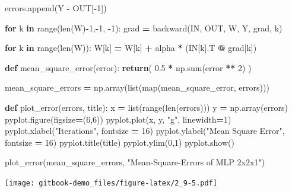 \documentclass[
]{book}
\newenvironment{Shaded}{\begin{snugshade}}{\end{snugshade}}
\newcommand{\BuiltInTok}[1]{#1}
\newcommand{\ControlFlowTok}[1]{\textcolor[rgb]{0.13,0.29,0.53}{\textbf{#1}}}
\newcommand{\DecValTok}[1]{\textcolor[rgb]{0.00,0.00,0.81}{#1}}
\newcommand{\FloatTok}[1]{\textcolor[rgb]{0.00,0.00,0.81}{#1}}
\newcommand{\KeywordTok}[1]{\textcolor[rgb]{0.13,0.29,0.53}{\textbf{#1}}}
\newcommand{\NormalTok}[1]{#1}
\newcommand{\OperatorTok}[1]{\textcolor[rgb]{0.81,0.36,0.00}{\textbf{#1}}}
\newcommand{\StringTok}[1]{\textcolor[rgb]{0.31,0.60,0.02}{#1}}
\begin{document}
\begin{Shaded}
\begin{Highlighting}[]
\NormalTok{  errors.append(Y }\OperatorTok{{-}}\NormalTok{ OUT[}\OperatorTok{{-}}\DecValTok{1}\NormalTok{])}
    
  \ControlFlowTok{for}\NormalTok{ k }\KeywordTok{in} \BuiltInTok{range}\NormalTok{(}\BuiltInTok{len}\NormalTok{(W)}\OperatorTok{{-}}\DecValTok{1}\NormalTok{,}\OperatorTok{{-}}\DecValTok{1}\NormalTok{, }\OperatorTok{{-}}\DecValTok{1}\NormalTok{):}
\NormalTok{    grad }\OperatorTok{=}\NormalTok{ backward(IN, OUT, W, Y, grad, k) }
    
  \ControlFlowTok{for}\NormalTok{ k }\KeywordTok{in} \BuiltInTok{range}\NormalTok{(}\BuiltInTok{len}\NormalTok{(W)):}
\NormalTok{    W[k] }\OperatorTok{=}\NormalTok{ W[k] }\OperatorTok{+}\NormalTok{ alpha }\OperatorTok{*}\NormalTok{ (IN[k].T }\OperatorTok{@}\NormalTok{ grad[k])}



\KeywordTok{def}\NormalTok{ mean\_square\_error(error):}
  \ControlFlowTok{return}\NormalTok{( }\FloatTok{0.5} \OperatorTok{*}\NormalTok{ np.}\BuiltInTok{sum}\NormalTok{(error }\OperatorTok{**} \DecValTok{2}\NormalTok{) )}

\NormalTok{mean\_square\_errors }\OperatorTok{=}\NormalTok{ np.array(}\BuiltInTok{list}\NormalTok{(}\BuiltInTok{map}\NormalTok{(mean\_square\_error, errors)))}

\KeywordTok{def}\NormalTok{ plot\_error(errors, title):}
\NormalTok{  x }\OperatorTok{=} \BuiltInTok{list}\NormalTok{(}\BuiltInTok{range}\NormalTok{(}\BuiltInTok{len}\NormalTok{(errors)))}
\NormalTok{  y }\OperatorTok{=}\NormalTok{ np.array(errors)}
\NormalTok{  pyplot.figure(figsize}\OperatorTok{=}\NormalTok{(}\DecValTok{6}\NormalTok{,}\DecValTok{6}\NormalTok{))}
\NormalTok{  pyplot.plot(x, y, }\StringTok{"g"}\NormalTok{, linewidth}\OperatorTok{=}\DecValTok{1}\NormalTok{)}
\NormalTok{  pyplot.xlabel(}\StringTok{"Iterations"}\NormalTok{, fontsize }\OperatorTok{=} \DecValTok{16}\NormalTok{)}
\NormalTok{  pyplot.ylabel(}\StringTok{"Mean Square Error"}\NormalTok{, fontsize }\OperatorTok{=} \DecValTok{16}\NormalTok{)}
\NormalTok{  pyplot.title(title)}
\NormalTok{  pyplot.ylim(}\DecValTok{0}\NormalTok{,}\DecValTok{1}\NormalTok{)}
\NormalTok{  pyplot.show()}
  
\NormalTok{plot\_error(mean\_square\_errors, }\StringTok{"Mean{-}Square{-}Errors of MLP 2x2x1"}\NormalTok{)}
\end{Highlighting}
\end{Shaded}

\texttt{[image: gitbook-demo\_files/figure-latex/2\_9-5.pdf]}
\end{document}
